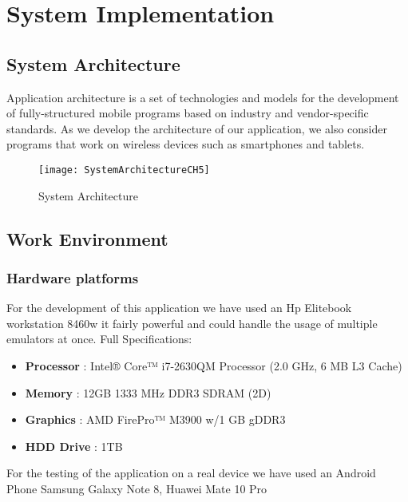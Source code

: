 \chapter{System Implementation} \label{chap:sysImplementation}

\section*{}
\section{System Architecture}
Application architecture is a set of technologies and models for the development of 
fully-structured mobile programs based on industry and vendor-specific standards. As we develop the architecture of our application, we also consider programs that work on wireless devices such as smartphones and tablets.

\begin{figure}[ht]
\center
\texttt{[image: SystemArchitectureCH5]}
\caption{System Architecture}
\label{fig:System Architecture}
\end{figure}

\section{Work Environment}

\subsection{Hardware platforms}
For the development of this application we have used an Hp Elitebook workstation 8460w it fairly powerful and could handle the usage of multiple emulators at once. Full Specifications:

\begin{itemize}
\item \textbf{Processor} : Intel® Core™ i7-2630QM Processor (2.0 GHz, 6 MB L3 Cache)
\item \textbf{Memory }: 12GB 1333 MHz DDR3 SDRAM (2D)
\item \textbf{Graphics }: AMD FirePro™ M3900 w/1 GB gDDR3
\item \textbf{HDD Drive }: 1TB
\end{itemize}

For the testing of the application on a real device we have used an Android Phone Samsung Galaxy Note 8, Huawei  Mate 10 Pro

